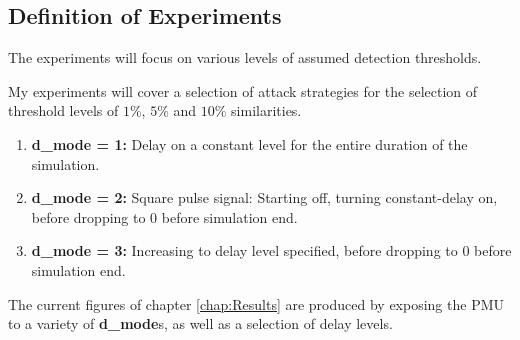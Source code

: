 \subsection{Definition of Experiments} \label{sec:ExpDef}






The experiments will focus on various levels of assumed detection thresholds.

My experiments will cover a selection of attack strategies for the selection of threshold levels of $1\%$, $5\%$ and $10\%$ similarities.

\begin{enumerate}
    \item \textbf{d\_mode = 1:} Delay on a constant level for the entire duration of the simulation. 
    \item \textbf{d\_mode = 2:} Square pulse signal: Starting off, turning constant-delay on,  before dropping to 0 before simulation end. 
    \item \textbf{d\_mode = 3:} Increasing to delay level specified, before dropping to 0 before simulation end. 
\end{enumerate}

The current figures of chapter \ref{chap:Results} are produced by exposing the PMU to a variety of \textbf{d\_mode}s, as well as a selection of delay levels.











